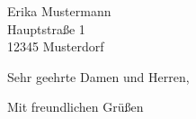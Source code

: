 \documentclass[
    11pt,
    a4paper,
    letter,
    parskip=yes,
    ]{scrlttr2}
\date{\today}
\begin{document}
\begin{letter}{
Erika Mustermann\\
Hauptstraße 1\\
12345 Musterdorf}

\opening{Sehr geehrte Damen und Herren,}

\lipsum[2-3] %

\closing{Mit freundlichen Grüßen}
\end{letter}
\end{document}

